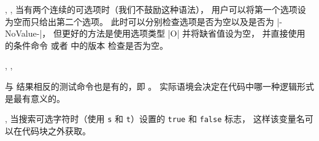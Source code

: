 \documentclass{l3doc}
\begin{document}
\begin{function}[EXP]{\IfNoValueT, \IfNoValueF, \IfNoValueTF}
当有两个连续的可选项时（我们不鼓励这种语法），
用户可以将第一个选项设为空而只给出第二个选项。
此时可以分别检查选项是否为空以及是否为 |-NoValue-|，
但更好的方法是使用选项类型 |O| 并将缺省值设为空，
并直接使用  的条件命令  或者  中的版本  检查是否为空。
%
\end{function}

\begin{function}[EXP]{\IfValueT, \IfValueF, \IfValueTF}
\begin{syntax}
       
\end{syntax}
与  结果相反的测试命令也是有的，即 。
实际语境会决定在代码中哪一种逻辑形式是最有意义的。
%
\end{function}


%
\begin{variable}{\BooleanFalse, \BooleanTrue}
    当搜索可选字符时（使用 \texttt{s} 和 \texttt{t}）设置的 \texttt{true} 和 \texttt{false} 标志，
    这样该变量名可以在代码块之外获取。
\end{variable}
\end{document}
